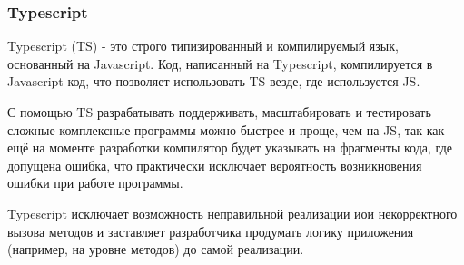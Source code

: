 \subsubsection{Typescript}

Typescript (TS) - это строго типизированный и компилируемый язык, основанный на Javascript. Код, написанный на Typescript, компилируется в Javascript-код, что позволяет использовать TS везде, где используется JS.

С помощью TS разрабатывать поддерживать, масштабировать и тестировать сложные комплексные программы можно быстрее и проще, чем на JS, так как ещё на моменте разработки компилятор будет указывать на фрагменты кода, где допущена ошибка, что практически исключает вероятность возникновения ошибки при работе программы.

Typescript исключает возможность неправильной реализации иои некорректного вызова методов и заставляет разработчика продумать логику приложения (например, на уровне методов) до самой реализации.